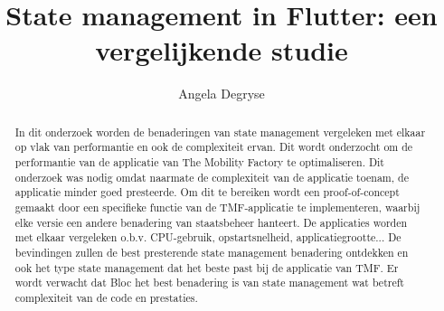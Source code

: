\documentclass{hogent-article}
\title{State management in Flutter: een vergelijkende studie}
\author{Angela Degryse}
\begin{document}
\begin{abstract}
In dit onderzoek worden de benaderingen van state management vergeleken met elkaar op vlak van performantie en ook de complexiteit ervan. Dit wordt onderzocht om de performantie van de applicatie van The Mobility Factory te optimaliseren. Dit onderzoek was nodig omdat naarmate de complexiteit van de applicatie toenam, de applicatie minder goed presteerde. Om dit te bereiken wordt een proof-of-concept gemaakt door een specifieke functie van de TMF-applicatie te implementeren, waarbij elke versie een andere benadering van staatsbeheer hanteert. De applicaties worden met elkaar vergeleken o.b.v. CPU-gebruik, opstartsnelheid, applicatiegrootte... De bevindingen zullen de best presterende state management benadering ontdekken en ook het type state management dat het beste past bij de applicatie van TMF.  Er wordt verwacht dat Bloc het best benadering is van state management wat betreft complexiteit van de code en prestaties.
\end{abstract}

\tableofcontents



\printbibliography[heading=bibintoc]
\end{document}
